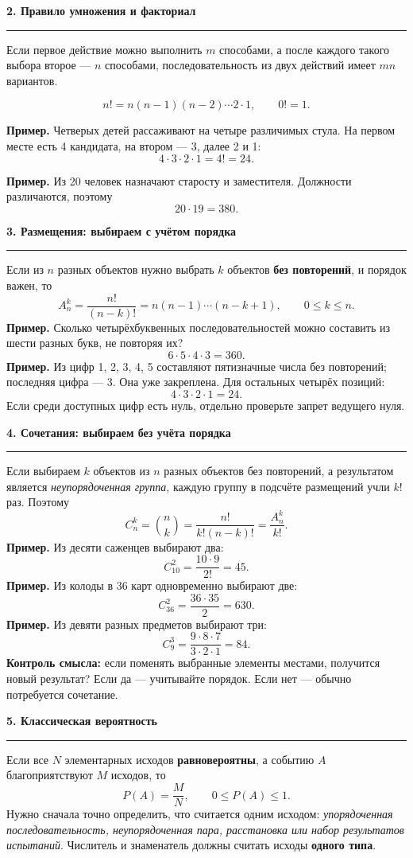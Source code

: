 \documentclass[a4paper,11pt]{article}
\newcommand{\topic}[1]{%
 \Needspace{5\baselineskip}\par\vspace{0.75em}%
 {\large\bfseries\color{darkaccent}#1}\par\vspace{0.35em}%
 {\color{accent}\rule{\linewidth}{0.55pt}}\par\vspace{0.4em}%
}
\newcommand{\ex}[1]{\textcolor{darkaccent}{\bfseries Пример.} #1}
\newcommand{\smallnote}[1]{{\small #1}}
\begin{document}
\topic{2. Правило умножения и факториал}
Если первое действие можно выполнить \(m\) способами, а после каждого такого выбора второе --- \(n\) способами, последовательность из двух действий имеет \(mn\) вариантов.

\[
 n!=n(n-1)(n-2)\cdots2\cdot1,\qquad 0!=1.
\]

\ex{Четверых детей рассаживают на четыре различимых стула. На первом месте есть 4 кандидата, на втором --- 3, далее 2 и 1:}
\[
4\cdot3\cdot2\cdot1=4!=\boxed{24}.
\]

\ex{Из 20 человек назначают старосту и заместителя. Должности различаются, поэтому}
\[
20\cdot19=\boxed{380}.
\]

\topic{3. Размещения: выбираем с учётом порядка}
Если из \(n\) разных объектов нужно выбрать \(k\) объектов \textbf{без повторений}, и порядок важен, то
\[
\boxed{A_n^k=\frac{n!}{(n-k)!}=n(n-1)\cdots(n-k+1)},\qquad 0\le k\le n.
\]
\ex{Сколько четырёхбуквенных последовательностей можно составить из шести разных букв, не повторяя их?}
\[
6\cdot5\cdot4\cdot3=\boxed{360}.
\]
\ex{Из цифр 1, 2, 3, 4, 5 составляют пятизначные числа без повторений; последняя цифра --- 3. Она уже закреплена. Для остальных четырёх позиций:}
\[
4\cdot3\cdot2\cdot1=\boxed{24}.
\]
\smallnote{Если среди доступных цифр есть нуль, отдельно проверьте запрет ведущего нуля.}

\topic{4. Сочетания: выбираем без учёта порядка}
Если выбираем \(k\) объектов из \(n\) разных объектов без повторений, а результатом является \emph{неупорядоченная группа}, каждую группу в подсчёте размещений учли \(k!\) раз. Поэтому
\[
\boxed{C_n^k=\binom nk=\frac{n!}{k!(n-k)!}=\frac{A_n^k}{k!}}.
\]
\ex{Из десяти саженцев выбирают два:}
\[
 C_{10}^{2}=\frac{10\cdot9}{2!}=\boxed{45}.
\]
\ex{Из колоды в 36 карт одновременно выбирают две:}
\[
 C_{36}^{2}=\frac{36\cdot35}{2}=\boxed{630}.
\]
\ex{Из девяти разных предметов выбирают три:}
\[
 C_9^3=\frac{9\cdot8\cdot7}{3\cdot2\cdot1}=\boxed{84}.
\]
\textbf{Контроль смысла:} если поменять выбранные элементы местами, получится новый результат? Если да --- учитывайте порядок. Если нет --- обычно потребуется сочетание.

\topic{5. Классическая вероятность}
Если все \(N\) элементарных исходов \textbf{равновероятны}, а событию \(A\) благоприятствуют \(M\) исходов, то
\[
\boxed{P(A)=\frac{M}{N}},\qquad 0\le P(A)\le1.
\]
Нужно сначала точно определить, что считается одним исходом: \emph{упорядоченная последовательность, неупорядоченная пара, расстановка или набор результатов испытаний}. Числитель и знаменатель должны считать исходы \textbf{одного типа}.
\end{document}
